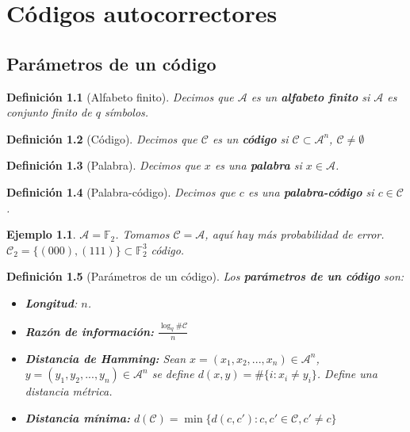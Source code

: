 \documentclass[spanish]{book}
\newtheorem{mydef}{Definición}
\newtheorem{ejem}{Ejemplo}
\begin{document}
\chapter{Códigos autocorrectores}
\section{Parámetros de un código}

\begin{mydef}[Alfabeto finito]
	Decimos que $\mathcal{A}$ es un \textbf{alfabeto finito} si $\mathcal{A}$ es conjunto finito de $q$ símbolos.
\end{mydef}

\begin{mydef}[Código]
	Decimos que $\mathcal{C}$ es un \textbf{código} si $\mathcal{C} \subset \mathcal{A}^n$, $\mathcal{C} \neq \emptyset$
\end{mydef}

\begin{mydef}[Palabra]
	Decimos que $x$ es una \textbf{palabra} si $x \in \mathcal{A}$.
\end{mydef}

\begin{mydef}[Palabra-código]
	Decimos que $c$ es una \textbf{palabra-código} si $c \in \mathcal{C}$.
\end{mydef}

\begin{ejem}
	$\mathcal{A}=\mathbb{F}_2$. 
	Tomamos $\mathcal{C}=\mathcal{A}$, aquí hay más probabilidad de error. 
	$\mathcal{C}_2=\{( 0 0 0 ), (1 1 1)\} \subset \mathbb{F}_2^3$ código.
\end{ejem}

\begin{mydef}[Parámetros de un código]
	Los \textbf{parámetros de un código} son: 
	\begin{itemize}
		\item \textbf{Longitud}: $n$.
		\item  \textbf{Razón de información: } $\displaystyle \frac{\log_q{\# \mathcal{C}}}{n}$
		
		\item \textbf{Distancia de Hamming: } Sean $x=(x_1, x_2, ..., x_n) \in \mathcal{A}^n$, $y=(y_1, y_2, ..., y_n) \in \mathcal{A}^n$ se define $d(x, y)= \#\{i : x_i \neq y_i \}$. Define una distancia métrica.
		\item \textbf{Distancia mínima: } $d(\mathcal{C})= \min\{d(c, c') : c, c' \in \mathcal{C}, c' \neq c\}$
	\end{itemize}
\end{mydef}
\end{document}
